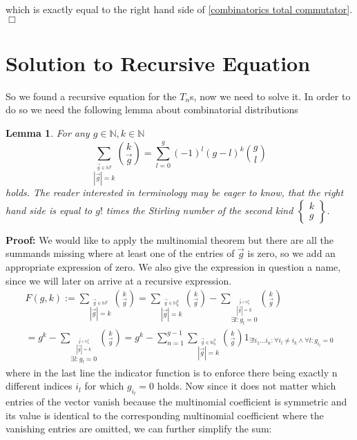 \documentclass[b5paper,draft,openbib,12pt]{memoir}
\newtheorem{Lemma}[Def]{Lemma}
\begin{document}
which is exactly equal to the right hand side of \eqref{combinatorics total commutator}. \(\Box\)

\section{Solution to Recursive Equation}

So we found a recursive equation for the \(T_n\)s, now we need to solve it. 
In order to do so we need the following lemma about combinatorial distributions

\begin{Lemma}\label{stirling lemma}
For any \(g\in\mathbb{N},k\in\mathbb{N}\)
\begin{equation}
\sum_{\stackrel{\vec{g}\in\mathbb{N}^g}{|\vec{g}|=k}} \binom{k}{\vec{g}}=\sum_{l=0}^g (-1)^l (g-l)^k \binom{g}{l}
\end{equation}
holds. The reader interested in terminology may be eager to know, that the right hand side is equal to
 \(g!\) times the Stirling 
number of the second kind \(\left\{\begin{matrix}k\\g\end{matrix}\right\}\).
\end{Lemma}
\textbf{Proof:} We would like to apply the multinomial theorem but there are all the summands missing where at least
one of the entries of \(\vec{g}\) is zero, so we add an appropriate expression of zero. We also give the expression in
question a name, since we will later on arrive at a recursive expression.
\begin{multline}
F(g,k):=\sum_{\stackrel{\vec{g}\in\mathbb{N}^g}{|\vec{g}|=k}} \binom{k}{\vec{g}}
= \sum_{\stackrel{\vec{g}\in\mathbb{N}_0^g}{|\vec{g}|=k}} \binom{k}{\vec{g}}
- \sum_{\stackrel{\stackrel{\vec{g}\in\mathbb{N}_0^g}{|\vec{g}|=k}}{\exists l: g_l=0}} \binom{k}{\vec{g}}\\
= g^k 
 - \sum_{\stackrel{\stackrel{\vec{g}\in\mathbb{N}_0^g}{|\vec{g}|=k}}{\exists l: g_l=0}} \binom{k}{\vec{g}}
=g^k 
- \sum_{n=1}^{g-1} \sum_{\stackrel{\vec{g}\in\mathbb{N}_0^g}{|\vec{g}|=k}}
 \binom{k}{\vec{g}} 1_{\exists! i_1\dots i_n : \forall i_l\neq i_k \wedge \forall l :g_{i_l}=0}
\end{multline}
where in the last line the indicator function is to enforce there being exactly n different indices \(i_l\) for which \(g_{i_l}=0\)
holds. Now since it does not matter which entries of the vector vanish because the multinomial coefficient 
is symmetric and its value is identical to the corresponding multinomial coefficient where the vanishing entries
are omitted, we can further simplify the sum:
\end{document}
